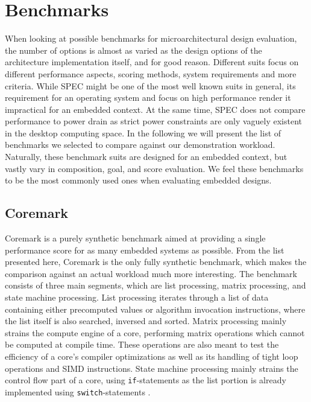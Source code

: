 \documentclass[../bachelor_paper.tex]{subfiles}
\begin{document}
\chapter{Benchmarks}
    \label{ch:bench}

When looking at possible benchmarks for microarchitectural design evaluation, the number of options is almost as varied as the design options of the architecture implementation itself, and for good reason. Different suits focus on different performance aspects, scoring methods, system requirements and more criteria. While \acs{SPEC} might be one of the most well known suits in general, its requirement for an operating system and focus on high performance render it impractical for an embedded context. At the same time, \acs{SPEC} does not compare performance to power drain as strict power constraints are only vaguely existent in the desktop computing space. In the following we will present the list of benchmarks we selected to compare against our demonstration workload. Naturally, these benchmark suits are designed for an embedded context, but vastly vary in composition, goal, and score evaluation. We feel these benchmarks to be the most commonly used ones when evaluating embedded designs. 

\section{Coremark}
Coremark is a purely synthetic benchmark aimed at providing a single performance score for as many embedded systems as possible. From the list presented here, Coremark is the only fully synthetic benchmark, which makes the comparison against an actual workload much more interesting. The benchmark consists of three main segments, which are list processing, matrix processing, and state machine processing. List processing iterates through a list of data containing either precomputed values or algorithm invocation instructions, where the list itself is also searched, inversed and sorted. Matrix processing mainly strains the compute engine of a core, performing matrix operations which cannot be computed at compile time. These operations are also meant to test the efficiency of a core's compiler optimizations as well as its handling of tight loop operations and \ac{SIMD} instructions. State machine processing mainly strains the control flow part of a core, using \texttt{if}-statements as the list portion is already implemented using \texttt{switch}-statements \cite{gal-onExploringCoremarkBenchmark2012}.
\end{document}
